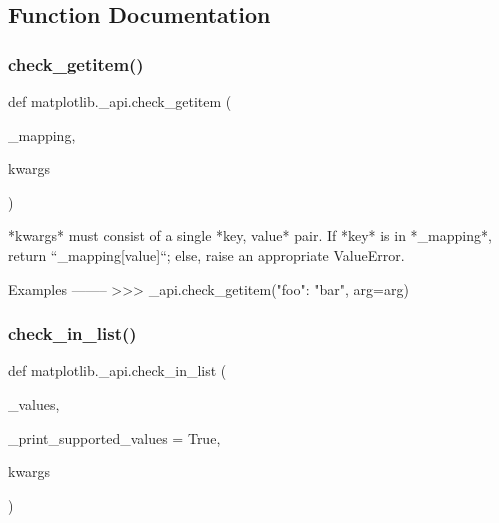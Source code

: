 \subsection{Function Documentation}
\mbox{\label{namespacematplotlib_1_1__api_af99f136fe109fdbc3c686232d820e987}} 
\subsubsection{\texorpdfstring{check\+\_\+getitem()}{check\_getitem()}}
{\footnotesize\ttfamily def matplotlib.\+\_\+api.\+check\+\_\+getitem (\begin{DoxyParamCaption}\item[{}]{\+\_\+mapping,  }\item[{}]{kwargs }\end{DoxyParamCaption})}

\begin{DoxyVerb}*kwargs* must consist of a single *key, value* pair.  If *key* is in
*_mapping*, return ``_mapping[value]``; else, raise an appropriate
ValueError.

Examples
--------
>>> _api.check_getitem({"foo": "bar"}, arg=arg)
\end{DoxyVerb}
 \mbox{\label{namespacematplotlib_1_1__api_a2164c58d6f07e67f7d7d486d53b24c47}} 
\subsubsection{\texorpdfstring{check\+\_\+in\+\_\+list()}{check\_in\_list()}}
{\footnotesize\ttfamily def matplotlib.\+\_\+api.\+check\+\_\+in\+\_\+list (\begin{DoxyParamCaption}\item[{}]{\+\_\+values,  }\item[{}]{\+\_\+print\+\_\+supported\+\_\+values = {\ttfamily True},  }\item[{}]{kwargs }\end{DoxyParamCaption})}

